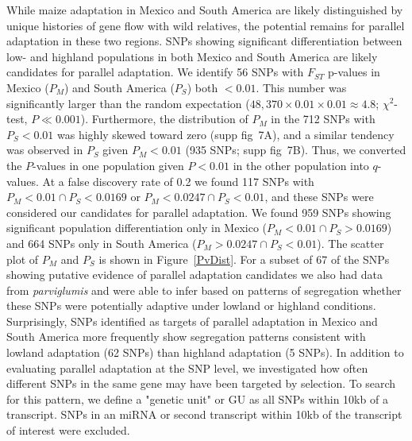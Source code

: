 {While maize adaptation in Mexico and South America are likely distinguished by unique histories of gene flow with wild relatives, the potential remains for parallel adaptation in these two regions.  
SNPs showing significant differentiation between low- and highland populations in both Mexico and South America are likely candidates for parallel adaptation. 
We identify 56 SNPs with $F_{ST}$ p-values in Mexico ($P_M$) and South America ($P_S$) both $<0.01$.   
This number  was significantly larger than the random expectation ($48,370\times 0.01 \times 0.01 \approx 4.8$; $\chi^2$-test, $P\ll0.001$).  Furthermore, the distribution of $P_M$ in the 712 SNPs with $P_S<0.01$ was highly skewed toward zero (supp fig~7A), and a similar tendency was observed in $P_S$ given $P_M<0.01$ (935 SNPs; supp fig~7B).  Thus, we converted the $P$-values in one population given $P<0.01$ in the other population into $q$-values.  
At a false discovery rate of 0.2 we found 117 SNPs with $P_M<0.01 \cap P_S < 0.0169$ or $P_M<0.0247 \cap P_S < 0.01$, and these SNPs were considered our candidates for parallel adaptation.
We found 959 SNPs showing significant population differentiation only in Mexico ($P_M<0.01 \cap P_S > 0.0169$) and 664 SNPs only in South America  ($P_M>0.0247 \cap P_S < 0.01$).  The scatter plot of $P_M$ and $P_S$ is shown in Figure~\ref{PvDist}.  
For a subset of 67 of the SNPs showing putative evidence of parallel adaptation candidates we also had data from \textit{parviglumis} and were able to infer based on patterns of segregation whether these SNPs were potentially adaptive under lowland or highland conditions.  Surprisingly, SNPs identified as targets of parallel adaptation in Mexico and South America more frequently show segregation patterns consistent with lowland adaptation (62 SNPs) than highland adaptation (5 SNPs). %
%
%
%
In addition to evaluating parallel adaptation at the SNP level, we investigated how often different SNPs in the same gene may have been targeted by selection. To search for this pattern, we define a "genetic unit" or GU as all SNPs within 10kb of a transcript.  SNPs in an miRNA or second transcript within 10kb of the transcript of interest were excluded.  
}
